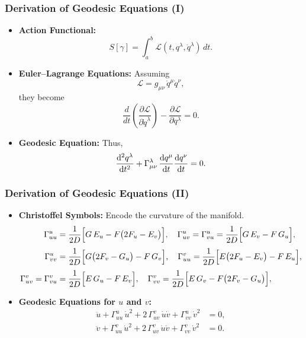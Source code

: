\documentclass[12pt]{beamer}
\begin{document}
\begin{frame}
  \frametitle{Derivation of Geodesic Equations (I)}
  \footnotesize
  \begin{itemize}
    \item \textbf{Action Functional:}
      \[
      S[\gamma] = \int_{a}^{b} \mathcal{L}(t, q^\lambda, \dot{q}^\lambda)\, dt.
      \]
    \item \textbf{Euler--Lagrange Equations:} Assuming 
      \[
      \mathcal{L} = g_{\mu\nu}\,\dot{q}^\mu\dot{q}^\nu,
      \]
      they become
      \[
      \frac{d}{dt}\!\left(\frac{\partial \mathcal{L}}{\partial \dot{q}^\lambda}\right) - \frac{\partial \mathcal{L}}{\partial q^\lambda} = 0.
      \]
    \item \textbf{Geodesic Equation:} Thus,
      \[
      \dv[2]{q^\lambda}{t} + \Gamma^\lambda_{\mu\nu}\,\dv{q^\mu}{t}\dv{q^\nu}{t} = 0.
      \]
  \end{itemize}
\end{frame}

\begin{frame}
  \frametitle{Derivation of Geodesic Equations (II)}
  \footnotesize
  \begin{itemize}
    \item \textbf{Christoffel Symbols:} Encode the curvature of the manifold.
      \[
      \begin{aligned}
      \Gamma^u_{uu} &= \frac{1}{2D}\Bigl[G\,E_u - F\bigl(2F_u - E_v\bigr)\Bigr], \quad \Gamma^u_{uv} = \Gamma^u_{vu} = \frac{1}{2D}\Bigl[G\,E_v - F\,G_u\Bigr],\\[1mm]
      \Gamma^u_{vv} &= \frac{1}{2D}\Bigl[G\bigl(2F_v - G_u\bigr) - F\,G_v\Bigr], \quad \Gamma^v_{uu} = \frac{1}{2D}\Bigl[E\bigl(2F_u - E_v\bigr) - F\,E_u\Bigr],\\[1mm]
      \Gamma^v_{uv} = \Gamma^v_{vu} &= \frac{1}{2D}\Bigl[E\,G_u - F\,E_v\Bigr], \quad \Gamma^v_{vv} = \frac{1}{2D}\Bigl[E\,G_v - F\bigl(2F_v - G_u\bigr)\Bigr],
      \end{aligned}
      \]
    \item \textbf{Geodesic Equations for \(u\) and \(v\):}
      \begin{align}
        \ddot{u} + \Gamma^u_{uu}\,\dot{u}^2 + 2\,\Gamma^v_{uv}\,\dot{u}\dot{v} + \Gamma^u_{vv}\,\dot{v}^2 &= 0, \label{eq:geo1}\\[1ex]
        \ddot{v} + \Gamma^v_{uu}\,\dot{u}^2 + 2\,\Gamma^v_{uv}\,\dot{u}\dot{v} + \Gamma^v_{vv}\,\dot{v}^2 &= 0. \label{eq:geo2}
      \end{align}
  \end{itemize}
\end{frame}
\end{document}
